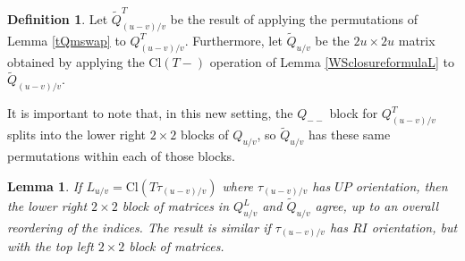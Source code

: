 \documentclass[11pt]{amsart}
\theoremstyle{plain}
\newtheorem{lemmaN}[theoremN]{Lemma}
\theoremstyle{definition}
\newtheorem{definitionN}[theoremN]{Definition}
\theoremstyle{remark}
\begin{document}
\begin{definitionN}
    Let $\widetilde{Q}_{(u-v)/v}^T$ be the result of applying the permutations of Lemma \ref{tQmswap} to $Q_{(u-v)/v}^T$. Furthermore, let $\widetilde{Q}_{u/v}$ be the $2u \times 2u$ matrix obtained by applying the $\text{Cl}(T-)$ operation of Lemma \ref{WSclosureformulaL} to $\widetilde{Q}_{(u-v)/v}$.
\end{definitionN}

It is important to note that, in this new setting, the $Q_{--}$ block for $Q_{(u-v)/v}^T$ splits into the lower right $2\times 2$ blocks of $Q_{u/v}$, so $\widetilde{Q}_{u/v}$ has these same permutations within each of those blocks.

\begin{lemmaN}
\label{Lbottomblockperm}
    If $L_{u/v}=\text{Cl}(T\tau_{(u-v)/v})$ where $\tau_{(u-v)/v}$ has $UP$ orientation, then the lower right $2\times 2$ block of matrices in $Q_{u/v}^L$ and $\widetilde{Q}_{u/v}$ agree, up to an overall reordering of the indices. The result is similar if $\tau_{(u-v)/v}$ has $RI$ orientation, but with the top left $2\times 2$ block of matrices.
\end{lemmaN}
\end{document}
